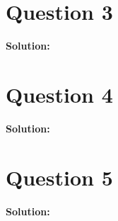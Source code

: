 \documentclass[12pt, oneside]{article}
\begin{document}
\section{Question 3}
\textbf{Solution:}

\section{Question 4}
\textbf{Solution:}

\section{Question 5}
\textbf{Solution:}
\end{document}
